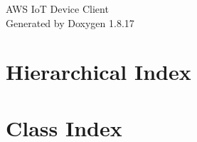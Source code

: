 \let\mypdfximage\pdfximage\def\pdfximage{\immediate\mypdfximage}\documentclass[twoside]{book}
\newcommand{\+}{\discretionary{\mbox{\scriptsize$\hookleftarrow$}}{}{}}
\newcommand{\clearemptydoublepage}{%
  \newpage{\pagestyle{empty}\cleardoublepage}%
}
\begin{document}
\hypersetup{pageanchor=false,
             bookmarksnumbered=true,
             pdfencoding=unicode
            }
\begin{titlepage}
\vspace*{7cm}
\begin{center}%
{\Large A\+WS IoT Device Client }\\
\vspace*{1cm}
{\large Generated by Doxygen 1.8.17}\\
\end{center}
\end{titlepage}
\clearemptydoublepage
{}
\tableofcontents
\clearemptydoublepage
{}
\hypersetup{pageanchor=true}

\chapter{Hierarchical Index}

\chapter{Class Index}

\end{document}

